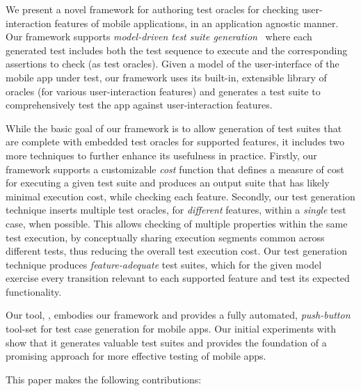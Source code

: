 We present a novel framework for authoring test oracles for checking
user-interaction features of mobile applications, in an application
agnostic manner.  Our framework supports
\emph{model-driven test suite generation}~\cite{SwTestBk:2007} where each
generated test includes both the test sequence to execute and the
corresponding assertions to check (as test oracles).  Given 
a model of the user-interface of the mobile app under test, our
framework uses its built-in, extensible library of oracles (for
various user-interaction features) and generates a test suite to
comprehensively test the app against user-interaction
features.

While the basic goal of our framework is to allow generation of test
suites that are complete with embedded test oracles for supported
features, it includes two more techniques to further enhance its
usefulness in practice.  %
Firstly, our framework supports a customizable \emph{cost} 
function that defines a measure of cost for executing %
a given test suite and produces an output suite that has likely minimal 
execution cost, while checking each feature.
Secondly, our test generation technique inserts multiple test oracles, for 
\emph{different} features, within a \emph{single} test case, when possible.
This allows checking of multiple properties within the same test execution,
by conceptually sharing execution segments common across different tests,
thus reducing the overall test execution cost.
Our test generation technique produces
\emph{feature-adequate} test suites, which for the given
model exercise every transition relevant to each supported feature and
test its expected functionality.

Our tool, \tool, embodies our framework and provides a fully
automated, \emph{push-button} tool-set for test case generation for
mobile apps.  Our initial experiments with \tool{} show that it generates
valuable test suites and provides the foundation of a promising
approach for more effective testing of mobile apps.

This paper makes the following contributions:


